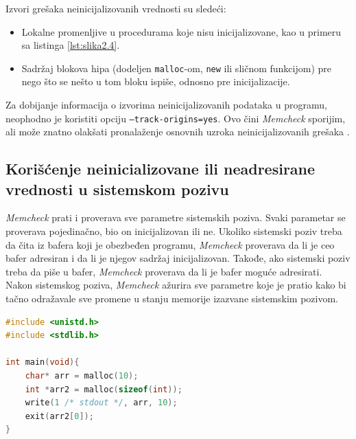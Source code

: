 \documentclass[12pt,oneside]{memoir}
\theoremstyle{plain}
\theoremstyle{definition}
\begin{document}
Izvori grešaka neinicijalizovanih vrednosti su sledeći:
\begin{itemize}
\item Lokalne promenljive u procedurama koje nisu inicijalizovane, kao u primeru sa listinga \ref{lst:slika2.4}.
\item Sadržaj blokova hipa (dodeljen \texttt{malloc}-om, \texttt{new} ili sličnom funkcijom) pre nego što se nešto u tom bloku ispiše, odnosno pre inicijalizacije.
\end{itemize}

Za dobijanje informacija o izvorima neinicijalizovanih podataka u programu, neophodno je koristiti opciju \texttt{--track-origins=yes}. Ovo čini \textit{Memcheck} sporijim, ali može znatno olakšati pronalaženje osnovnih uzroka neinicijalizovanih grešaka \cite{ValgrindDOC}. 

\subsection{Korišćenje neinicializovane ili neadresirane vrednosti u sistemskom pozivu}

\textit{Memcheck} prati i proverava sve parametre sistemskih poziva. Svaki parametar se proverava pojedinačno, bio on inicijalizovan ili ne. Ukoliko sistemski poziv treba da čita iz bafera  koji je obezbeđen programu, \textit{Memcheck} proverava da li je ceo bafer adresiran i da li je njegov sadržaj inicijalizovan. Takođe, ako sistemski poziv treba da piše u bafer, \textit{Memcheck} proverava da li je bafer moguće adresirati. Nakon sistemskog poziva, \textit{Memcheck} ažurira sve parametre koje je pratio kako bi tačno odražavale sve promene u stanju memorije izazvane sistemskim pozivom.

\begin{lstlisting}[style=mystyle,caption={Program koji izaziva grešku korišćenja neinicializovane ili neadresirane vrednosti u sistemskom pozivu \cite{Memcheck}}, label={lst:slika2.6},language={C}] 
#include <unistd.h>
#include <stdlib.h>

int main(void){
	char* arr = malloc(10);
	int *arr2 = malloc(sizeof(int));
	write(1 /* stdout */, arr, 10);
	exit(arr2[0]);
}
\end{lstlisting}

\end{document}
